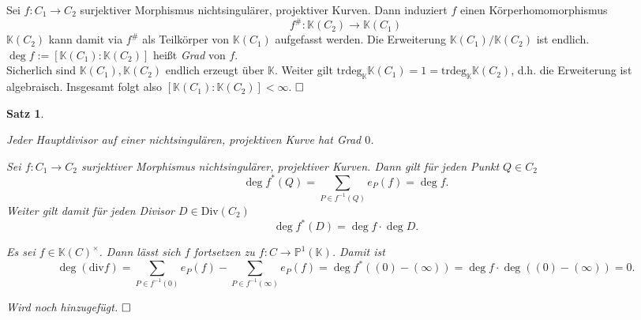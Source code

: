 \documentclass[11pt]{book}
\newtheorem{theorem}{Satz}[section]
\theoremstyle{nonumberbreak}
\newenvironment{pr}[1][]{\ifthenelse{\equal{#1}{}}{\proof}{\proof[#1]}\rm}{\endproof}
\newenvironment{bemdefin}[1][]{\ifthenelse{\equal{#1}{}}{\bemdefini}{\bemdefini[#1]}\rm}{\endbemdefini}
\begin{document}
\begin{spacing}{1.3}
\begin{bemdefin}
Sei $f: C_1 \longrightarrow C_2$ surjektiver Morphismus nichtsingulärer, projektiver Kurven. Dann induziert $f$ einen Körperhomomorphismus
$$f^{\#}: \mathbb{K}(C_2) \longrightarrow \mathbb{K}(C_1)$$
$\mathbb{K}(C_2)$ kann damit via $f^{\#}$ als Teilkörper von $\mathbb{K}(C_1)$ aufgefasst werden. Die Erweiterung $\mathbb{K}(C_1)/ \mathbb{K}(C_2)$ ist endlich. $\deg f := [ \mathbb{K}(C_1) : \mathbb{K}(C_2) ]$ heißt \textit{Grad} von $f$.\\
\begin{pr}
Sicherlich sind $\mathbb{K}(C_1), \mathbb{K}(C_2)$ endlich erzeugt über $\mathbb{K}$. Weiter gilt $\textrm{trdeg}_{\mathbb{K}}\mathbb{K}(C_1) = 1 = \textrm{trdeg}_{\mathbb{K}} \mathbb{K}(C_2)$, d.h. die Erweiterung ist algebraisch. Insgesamt folgt also $[\mathbb{K}(C_1): \mathbb{K}(C_2) ] < \infty$. $\hfill \Box$
\end{pr}
\end{bemdefin}

\begin{theorem} %

\begin{compactenum}
\item Jeder Hauptdivisor auf einer nichtsingulären, projektiven Kurve hat Grad $0$.
\item Sei $f: C_1 \longrightarrow C_2$ surjektiver Morphismus nichtsingulärer, projektiver Kurven. Dann gilt für jeden Punkt $Q \in C_2$
$$\deg f^{*}(Q) = \sum_{P \in f^{-1}(Q)} e_P(f) = \deg f.$$
Weiter gilt damit für jeden Divisor $D \in \textrm{Div}(C_2)$
$$\deg f^{*}(D) = \deg f \cdot \deg D.$$
\end{compactenum}
\begin{pr}
\begin{compactenum}
\item Es sei $f \in \mathbb{K}(C)^{\times}$. Dann lässt sich $f$ fortsetzen zu $f: C \longrightarrow \mathbb{P}^1(\mathbb{K})$. Damit ist
$$\deg (\textrm{div}f) = \sum_{P \in f^{-1}(0)} e_P(f) - \sum_{P \in f^{-1}(\infty)} e_P(f) = \deg f^{*}( (0)- (\infty)) = \deg f \cdot \deg\left( (0)-(\infty)\right) = 0.$$
\item Wird noch hinzugefügt. $\hfill \Box$
\end{compactenum}
\end{pr}
\end{theorem}







\renewcommand*\thesection{§ \arabic{section}\quad}

\end{spacing}
\end{document}
